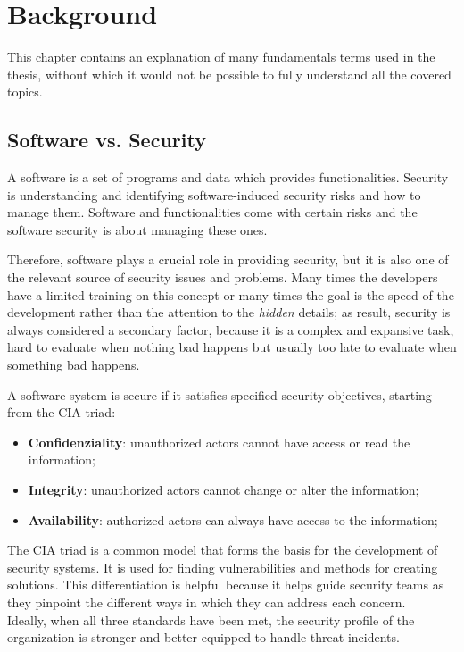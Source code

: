 \chapter{Background}
\label{cha:background}


This chapter contains an explanation of many fundamentals terms used in the thesis, without which it would not be possible to fully understand all the covered topics.

\section{Software vs. Security}

A software is a set of programs and data which provides functionalities. Security is understanding and identifying software-induced security risks and how to manage them. Software and functionalities come with certain risks and the software security is about managing these ones.

Therefore, software plays a crucial role in providing security, but it is also one of the relevant source of security issues and problems. Many times the developers have a limited training on this concept or many times the goal is the speed of the development rather than the attention to the \textit{hidden} details; as result, security is always considered a secondary factor, because it is a complex and expansive task, hard to evaluate when nothing bad happens but usually too late to evaluate when something bad happens.~\cite{st-slides}

A software system is secure if it satisfies specified security objectives, starting from the CIA triad:
\begin{itemize}
  \item \textbf{Confidenziality}: unauthorized actors cannot have access or read the information;
  \item \textbf{Integrity}: unauthorized actors cannot change or alter the information;
  \item \textbf{Availability}: authorized actors can always have access to the information;
\end{itemize}
The CIA triad is a common model that forms the basis for the development of security systems. It is used for finding vulnerabilities and methods for creating solutions. This differentiation is helpful because it helps guide security teams as they pinpoint the different ways in which they can address each concern.\\
Ideally, when all three standards have been met, the security profile of the organization is stronger and better equipped to handle threat incidents.~\cite{cia-triad}

